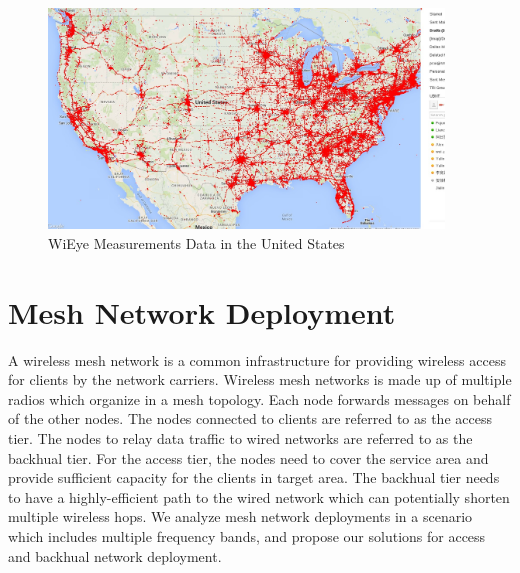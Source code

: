 
\begin{figure} 
\centering
\includegraphics[width=105mm]{figures/wieyedatamap}
\vspace{-0.1in}
\caption{WiEye Measurements Data in the United States}
\label{fig:wieyeapp}
\vspace{0.1in}
\end{figure}


\section{Mesh Network Deployment}

A wireless mesh network is a common infrastructure for providing 
wireless access for clients by the network carriers. Wireless 
mesh networks is made up of multiple radios which organize in a mesh 
topology. Each node forwards messages on behalf of the 
other nodes. The nodes connected to clients are referred to as the 
access tier. The nodes to relay data traffic to 
wired networks are referred to as the backhual tier. For the  access tier, the 
nodes need to cover the service area and provide sufficient 
capacity for the clients in target area. The backhual 
tier needs to have a highly-efficient path to the wired 
network which can potentially shorten multiple wireless hops. 
We analyze mesh network deployments in a scenario which includes multiple frequency bands, 
and propose our solutions for access and backhual 
network deployment.


